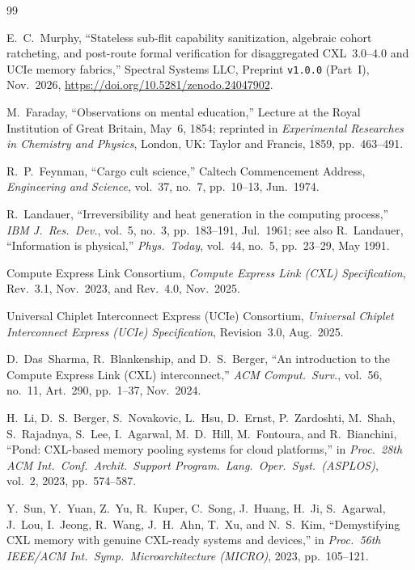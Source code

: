 \documentclass[10pt,twocolumn]{article}
\theoremstyle{spectralthm}
\begin{document}
\begin{thebibliography}{99}
\footnotesize

E.~C.~Murphy, ``Stateless sub-flit capability sanitization, algebraic cohort ratcheting, and post-route formal verification for disaggregated CXL~3.0--4.0 and UCIe memory fabrics,'' Spectral Systems LLC, Preprint \texttt{v1.0.0} (Part~I), Nov.\ 2026, \url{https://doi.org/10.5281/zenodo.24047902}.

M.~Faraday, ``Observations on mental education,'' Lecture at the Royal Institution of Great Britain, May~6, 1854; reprinted in \textit{Experimental Researches in Chemistry and Physics}, London, UK: Taylor and Francis, 1859, pp.~463--491.

R.~P.~Feynman, ``Cargo cult science,'' Caltech Commencement Address, \textit{Engineering and Science}, vol.~37, no.~7, pp.~10--13, Jun.\ 1974.

R.~Landauer, ``Irreversibility and heat generation in the computing process,'' \textit{IBM J.\ Res.\ Dev.}, vol.~5, no.~3, pp.~183--191, Jul.\ 1961; see also R.~Landauer, ``Information is physical,'' \textit{Phys.\ Today}, vol.~44, no.~5, pp.~23--29, May 1991.

Compute Express Link Consortium, \textit{Compute Express Link (CXL) Specification}, Rev.~3.1, Nov.\ 2023, and Rev.~4.0, Nov.\ 2025.

Universal Chiplet Interconnect Express (UCIe) Consortium, \textit{Universal Chiplet Interconnect Express (UCIe) Specification}, Revision~3.0, Aug.\ 2025.

D.~Das~Sharma, R.~Blankenship, and D.~S.~Berger, ``An introduction to the Compute Express Link (CXL) interconnect,'' \textit{ACM Comput.\ Surv.}, vol.~56, no.~11, Art.~290, pp.~1--37, Nov.\ 2024.

H.~Li, D.~S.~Berger, S.~Novakovic, L.~Hsu, D.~Ernst, P.~Zardoshti, M.~Shah, S.~Rajadnya, S.~Lee, I.~Agarwal, M.~D.~Hill, M.~Fontoura, and R.~Bianchini, ``Pond: CXL-based memory pooling systems for cloud platforms,'' in \textit{Proc.\ 28th ACM Int.\ Conf.\ Archit.\ Support Program.\ Lang.\ Oper.\ Syst.\ (ASPLOS)}, vol.~2, 2023, pp.~574--587.

Y.~Sun, Y.~Yuan, Z.~Yu, R.~Kuper, C.~Song, J.~Huang, H.~Ji, S.~Agarwal, J.~Lou, I.~Jeong, R.~Wang, J.~H.~Ahn, T.~Xu, and N.~S.~Kim, ``Demystifying CXL memory with genuine CXL-ready systems and devices,'' in \textit{Proc.\ 56th IEEE/ACM Int.\ Symp.\ Microarchitecture (MICRO)}, 2023, pp.~105--121.


\end{thebibliography}
\end{document}
